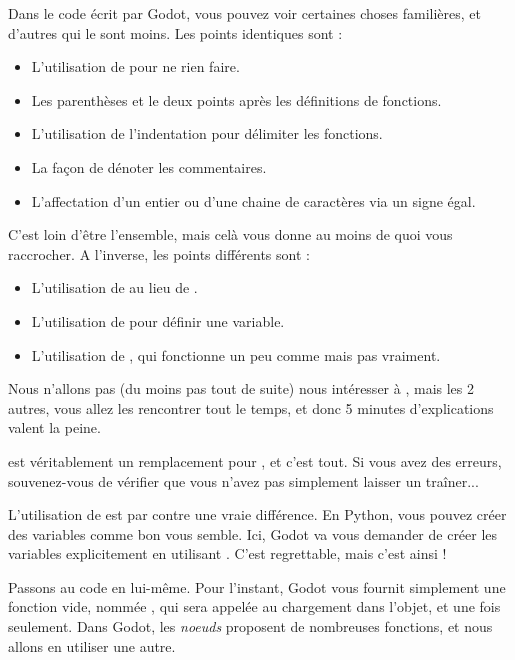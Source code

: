 Dans le code écrit par Godot, vous pouvez voir certaines choses familières, et d'autres qui le sont moins. Les points identiques sont :

\begin{itemize}
\item L'utilisation de  pour ne rien faire.
\item Les parenthèses et le deux points après les définitions de fonctions.
\item L'utilisation de l'indentation pour délimiter les fonctions.
\item La façon de dénoter les commentaires.
\item L'affectation d'un entier ou d'une chaine de caractères via un signe égal.
\end{itemize}

C'est loin d'être l'ensemble, mais celà vous donne au moins de quoi vous raccrocher. A l'inverse, les points différents sont :

\begin{itemize}
\item L'utilisation de  au lieu de .
\item L'utilisation de  pour définir une variable.
\item L'utilisation de , qui fonctionne un peu comme  mais pas vraiment.
\end{itemize}

Nous n'allons pas (du moins pas tout de suite) nous intéresser à , mais les 2 autres, vous allez les rencontrer tout le temps, et donc 5 minutes d'explications valent la peine.

 est véritablement un remplacement pour , et c'est tout. Si vous avez des erreurs, souvenez-vous de vérifier que vous n'avez pas simplement laisser un  traîner...

L'utilisation de  est par contre une vraie différence. En Python, vous pouvez créer des variables comme bon vous semble. Ici, Godot va vous demander de créer les variables explicitement en utilisant . C'est regrettable, mais c'est ainsi !

Passons au code en lui-même. Pour l'instant, Godot vous fournit simplement une fonction vide, nommée , qui sera appelée au chargement dans l'objet, et une fois seulement. Dans Godot, les \emph{noeuds} proposent de nombreuses fonctions, et nous allons en utiliser une autre.

